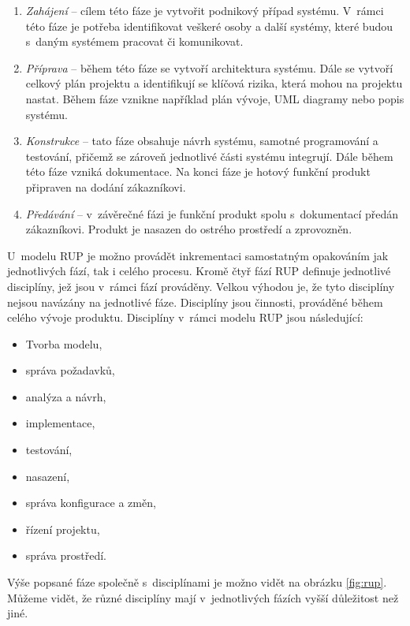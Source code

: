 \documentclass[czech,master]{diploma}
\begin{document}
\begin{enumerate}
\item \textit{Zahájení} -- cílem této fáze je vytvořit podnikový případ systému. V~rámci této fáze je potřeba identifikovat veškeré osoby a další systémy, které budou s~daným systémem pracovat či komunikovat.
\item \textit{Příprava} -- během této fáze se vytvoří architektura systému. Dále se vytvoří celkový plán projektu a identifikují se klíčová rizika, která mohou na projektu nastat. Během fáze vznikne například plán vývoje, UML diagramy nebo popis systému.
\item \textit{Konstrukce} -- tato fáze obsahuje návrh systému, samotné programování a testování, přičemž se zároveň jednotlivé části systému integrují. Dále během této fáze vzniká dokumentace. Na konci fáze je hotový funkční produkt připraven na dodání zákazníkovi.
\item \textit{Předávání} -- v~závěrečné fázi je funkční produkt spolu s~dokumentací předán zákazníkovi. Produkt je nasazen do ostrého prostředí a zprovozněn.
\end{enumerate}

U~modelu RUP je možno provádět inkrementaci samostatným opakováním jak jednotlivých fází, tak i celého procesu. Kromě čtyř fází RUP definuje jednotlivé disciplíny, jež jsou v~rámci fází prováděny. Velkou výhodou je, že tyto disciplíny nejsou navázány na jednotlivé fáze. Disciplíny jsou činnosti, prováděné během celého vývoje produktu. Disciplíny v~rámci modelu RUP jsou následující:

\begin{itemize}
\item Tvorba modelu,
\item správa požadavků,
\item analýza a návrh,
\item implementace,
\item testování,
\item nasazení,
\item správa konfigurace a změn,
\item řízení projektu,
\item správa prostředí.
\end{itemize}

Výše popsané fáze společně s~disciplínami je možno vidět na obrázku \ref{fig:rup}. Můžeme vidět, že různé disciplíny mají v~jednotlivých fázích vyšší důležitost než jiné.
\end{document}
